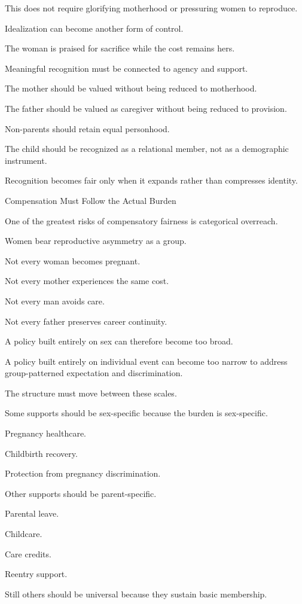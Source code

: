 This does not require glorifying motherhood or pressuring women to reproduce.

Idealization can become another form of control.

The woman is praised for sacrifice while the cost remains hers.

Meaningful recognition must be connected to agency and support.

The mother should be valued without being reduced to motherhood.

The father should be valued as caregiver without being reduced to provision.

Non-parents should retain equal personhood.

The child should be recognized as a relational member, not as a demographic instrument.

Recognition becomes fair only when it expands rather than compresses identity.

Compensation Must Follow the Actual Burden

One of the greatest risks of compensatory fairness is categorical overreach.

Women bear reproductive asymmetry as a group.

Not every woman becomes pregnant.

Not every mother experiences the same cost.

Not every man avoids care.

Not every father preserves career continuity.

A policy built entirely on sex can therefore become too broad.

A policy built entirely on individual event can become too narrow to address group-patterned expectation and discrimination.

The structure must move between these scales.

Some supports should be sex-specific because the burden is sex-specific.

Pregnancy healthcare.

Childbirth recovery.

Protection from pregnancy discrimination.

Other supports should be parent-specific.

Parental leave.

Childcare.

Care credits.

Reentry support.

Still others should be universal because they sustain basic membership.

